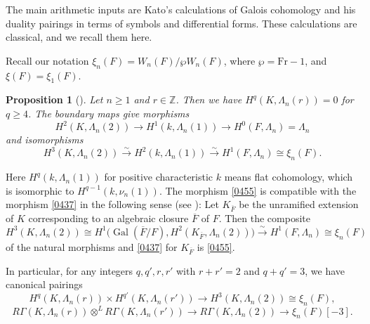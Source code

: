\documentclass{amsart}
\newtheorem{Prop}[Thm]{Proposition}
\theoremstyle{remark}
\numberwithin{equation}{subsection}
\newcommand{\isomto}{\overset{\sim}{\to}}
\newcommand{\closure}[1]{\overline{#1}}
\newcommand{\Z}{\mathbb{Z}}
\newcommand{\Frob}{\mathrm{Fr}}
\DeclareMathOperator{\Gal}{Gal}
\begin{document}
The main arithmetic inputs are Kato's calculations
of Galois cohomology and his duality pairings in terms of symbols and differential forms.
These calculations are classical, and we recall them here.

Recall our notation $\xi_{n}(F) = W_{n}(F) / \wp W_{n}(F)$,
where $\wp = \Frob - 1$,
and $\xi(F) = \xi_{1}(F)$.

\begin{Prop}[{\cite[\S 5, Theorem 1]{Kat79}}] \label{0041}
	Let $n \ge 1$ and $r \in \Z$.
	Then we have $H^{q}(K, \Lambda_{n}(r)) = 0$ for $q \ge 4$.
	The boundary maps give morphisms
		\begin{equation} \label{0437}
				H^{2}(K, \Lambda_{n}(2))
			\to
				H^{1}(k, \Lambda_{n}(1))
			\to
				H^{0}(F, \Lambda_{n})
			=
				\Lambda_{n}
		\end{equation}
	and isomorphisms
		\begin{equation} \label{0455}
				H^{3}(K, \Lambda_{n}(2))
			\isomto
				H^{2}(k, \Lambda_{n}(1))
			\isomto
				H^{1}(F, \Lambda_{n})
			\cong
				\xi_{n}(F).
		\end{equation}
\end{Prop}

Here $H^{q}(k, \Lambda_{n}(1))$ for positive characteristic $k$
means flat cohomology,
which is isomorphic to $H^{q - 1}(k, \nu_{n}(1))$.
The morphism \eqref{0455} is compatible with the morphism \eqref{0437}
in the following sense (see \cite[\S 5, Proof of Theorem 1, Step 4]{Kat79}):
Let $K_{\closure{F}}$ be the unramified extension of $K$
corresponding to an algebraic closure $\closure{F}$ of $F$.
Then the composite
	\begin{equation} \label{0491}
			H^{3}(K, \Lambda_{n}(2))
		\cong
			H^{1} \bigl(
				\Gal(\closure{F} / F),
				H^{2}(K_{\closure{F}}, \Lambda_{n}(2))
			\bigr)
		\isomto
			H^{1}(F, \Lambda_{n})
		\cong
			\xi_{n}(F)
	\end{equation}
of the natural morphisms and \eqref{0437} for $K_{\closure{F}}$ is \eqref{0455}.

In particular, for any integers $q, q', r, r'$ with $r + r' = 2$ and $q + q' = 3$,
we have canonical pairings
	\begin{equation} \label{0042}
			H^{q}(K, \Lambda_{n}(r))
		\times
			H^{q'}(K, \Lambda_{n}(r'))
		\to
			H^{3}(K, \Lambda_{n}(2))
		\cong
			\xi_{n}(F),
	\end{equation}
	\[
			R \Gamma(K, \Lambda_{n}(r))
		\otimes^{L}
			R \Gamma(K, \Lambda_{n}(r'))
		\to
			R \Gamma(K, \Lambda_{n}(2))
		\to
			\xi_{n}(F)[-3].
	\]
\end{document}
